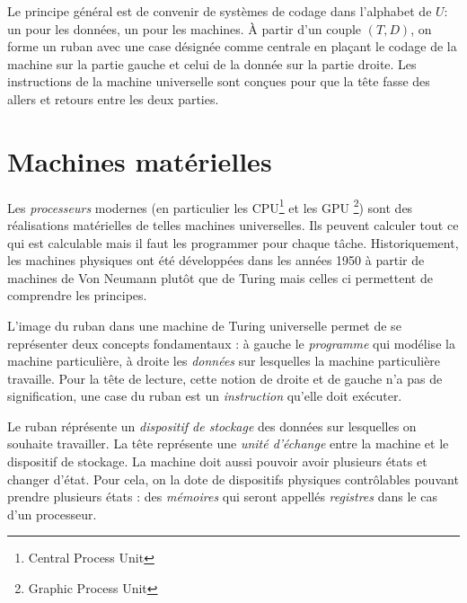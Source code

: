 Le principe général est de convenir de systèmes de codage dans l'alphabet de $U$: un pour les données, un pour les machines. \`A partir d'un couple $(T,D)$, on forme un ruban avec une case désignée comme centrale en plaçant le codage de la machine sur la partie gauche et celui de la donnée sur la partie droite. Les instructions de la machine universelle sont conçues pour que la tête fasse des allers et retours entre les deux parties.

\section{Machines matérielles}
Les \emph{processeurs} modernes (en particulier les CPU\footnote{Central Process Unit} et les GPU \footnote{Graphic Process Unit}) sont des réalisations matérielles de telles machines universelles. Ils peuvent calculer tout ce qui est calculable mais il faut les programmer pour chaque tâche. Historiquement, les machines physiques ont été développées dans les années 1950 à partir de machines de Von Neumann plutôt que de Turing mais celles ci permettent de comprendre les principes.

L'image du ruban dans une machine de Turing universelle permet de se représenter deux concepts fondamentaux : à gauche le \emph{programme} qui modélise la machine particulière, à droite les \emph{données} sur lesquelles la machine particulière travaille. Pour la tête de lecture, cette notion de droite et de gauche n'a pas de signification, une case du ruban est un \emph{instruction} qu'elle doit exécuter.

Le ruban réprésente un \emph{dispositif de stockage} des données sur lesquelles on souhaite travailler. La tête représente une \emph{unité d'échange} entre la machine et le dispositif de stockage. La machine doit aussi pouvoir avoir plusieurs états et changer d'état. Pour cela, on la dote de dispositifs physiques contrôlables pouvant prendre plusieurs états : des \emph{mémoires} qui seront appellés \emph{registres} dans le cas d'un processeur.

